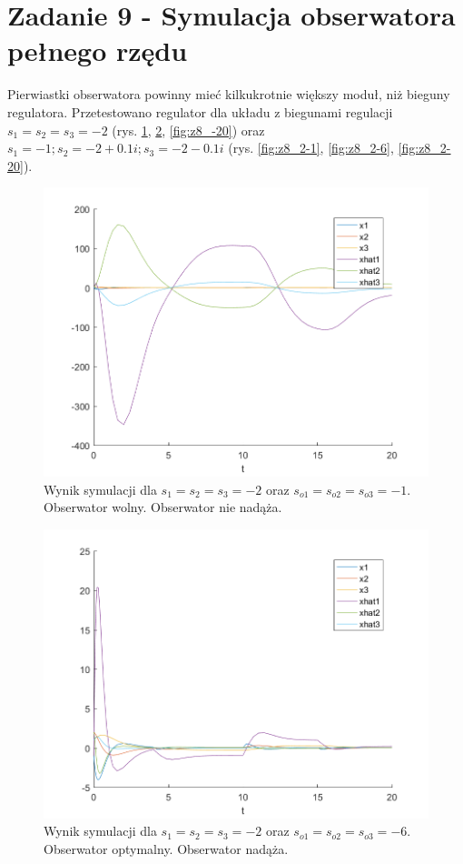 \documentclass{article}
\begin{document}
\section{Zadanie 9 - Symulacja obserwatora pełnego rzędu}
Pierwiastki obserwatora powinny mieć kilkukrotnie większy moduł, niż bieguny regulatora. Przetestowano regulator dla układu z biegunami regulacji $s_1 = s_2 = s_3 = -2$ (rys. \ref{fig:z8_-1}, \ref{fig:z8_-6}, \ref{fig:z8_-20}) oraz $s_1 = -1; s_2 = -2 + 0.1i; s_3 = -2 -0.1i$ (rys. \ref{fig:z8_2-1}, \ref{fig:z8_2-6}, \ref{fig:z8_2-20}).

\begin{figure}[H]
\centering
\includegraphics[width=0.9\linewidth]{z8_-1}
\caption{Wynik symulacji dla $s_1 = s_2 = s_3 = -2$ oraz $s_{o1}=s_{o2}=s_{o3} = -1$. Obserwator wolny. Obserwator nie nadąża.}
\label{fig:z8_-1}
\end{figure}

\begin{figure}[H]
\centering
\includegraphics[width=0.9\linewidth]{z8_-6}
\caption{Wynik symulacji dla $s_1 = s_2 = s_3 = -2$ oraz $s_{o1}=s_{o2}=s_{o3} = -6$. Obserwator optymalny. Obserwator nadąża.}
\label{fig:z8_-6}
\end{figure}
\end{document}
